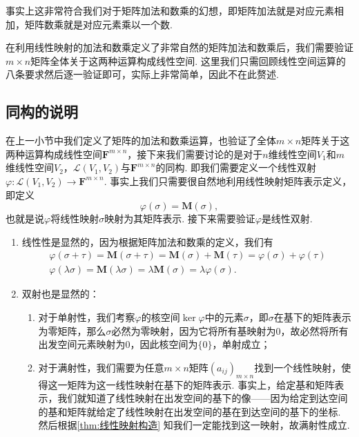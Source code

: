 事实上这非常符合我们对于矩阵加法和数乘的幻想，即矩阵加法就是对应元素相加，矩阵数乘就是对应元素乘以一个数.

在利用线性映射的加法和数乘定义了非常自然的矩阵加法和数乘后，我们需要验证$m\times n$矩阵全体关于这两种运算构成线性空间. 这里我们只需回顾线性空间运算的八条要求然后逐一验证即可，实际上非常简单，因此不在此赘述.

\subsection{同构的说明}

在上一小节中我们定义了矩阵的加法和数乘运算，也验证了全体$m\times n$矩阵关于这两种运算构成线性空间$\mathbf{F}^{m\times n}$，接下来我们需要讨论的是对于$n$维线性空间$V_1$和$m$维线性空间$V_2$，$\mathcal{L}(V_1,V_2)$与$\mathbf{F}^{m\times n}$的同构. 即我们需要定义一个线性双射$\varphi:\mathcal{L}(V_1,V_2)\to\mathbf{F}^{m\times n}$. 事实上我们只需要很自然地利用线性映射矩阵表示定义，即定义
\[\varphi(\sigma)=\mathbf{M}(\sigma),\]
也就是说$\varphi$将线性映射$\sigma$映射为其矩阵表示. 接下来需要验证$\varphi$是线性双射.
\begin{enumerate}
    \item 线性性是显然的，因为根据矩阵加法和数乘的定义，我们有
          \begin{gather*}
              \varphi(\sigma+\tau)=\mathbf{M}(\sigma+\tau)=\mathbf{M}(\sigma)+\mathbf{M}(\tau)=\varphi(\sigma)+\varphi(\tau) \\
              \varphi(\lambda\sigma)=\mathbf{M}(\lambda\sigma)=\lambda\mathbf{M}(\sigma)=\lambda\varphi(\sigma).
          \end{gather*}

    \item 双射也是显然的：
          \begin{enumerate}
              \item 对于单射性，我们考察$\varphi$的核空间$\ker\varphi$中的元素$\sigma$，即$\sigma$在基下的矩阵表示为零矩阵，那么$\sigma$必然为零映射，因为它将所有基映射为0，故必然将所有出发空间元素映射为0，因此核空间为$\{0\}$，单射成立；

              \item 对于满射性，我们需要为任意$m\times n$矩阵$(a_{ij})_{m\times n}$找到一个线性映射，使得这一矩阵为这一线性映射在基下的矩阵表示. 事实上，给定基和矩阵表示，我们就知道了线性映射在出发空间的基下的像——因为给定到达空间的基和矩阵就给定了线性映射在出发空间的基在到达空间的基下的坐标. 然后根据\autoref{thm:线性映射构造} 知我们一定能找到这一映射，故满射性成立.
          \end{enumerate}
\end{enumerate}


